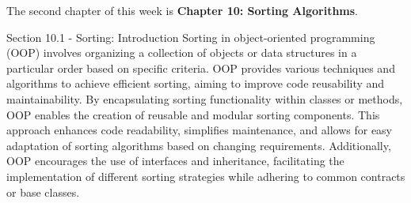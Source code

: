 The second chapter of this week is \textbf{Chapter 10: Sorting Algorithms}.

\begin{notes}{Section 10.1 - Sorting: Introduction}
    Sorting in object-oriented programming (OOP) involves organizing a collection of objects or data structures in a particular order based on specific criteria. OOP provides various techniques and algorithms to achieve efficient sorting, aiming to improve code reusability and maintainability. By encapsulating sorting functionality within classes or methods, OOP enables the creation of reusable and modular sorting components. This approach enhances code readability, simplifies 
maintenance, and allows for easy adaptation of sorting algorithms based on changing requirements. Additionally, OOP encourages the use of interfaces and inheritance, facilitating the implementation of different sorting strategies while adhering to common contracts or base classes.
\end{notes}

